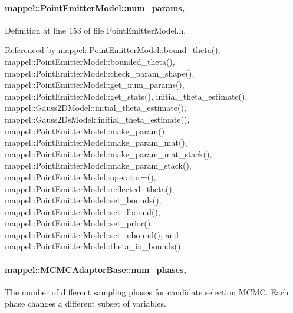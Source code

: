 \paragraph[{\texorpdfstring{num\+\_\+params}{num_params}}]{ mappel\+::\+Point\+Emitter\+Model\+::num\+\_\+params\hspace{0.3cm}{\ttfamily [protected]}, {\ttfamily [inherited]}}\hypertarget{classmappel_1_1PointEmitterModel_a9af0484391bd6021ddc04ac666ab49ad}{}\label{classmappel_1_1PointEmitterModel_a9af0484391bd6021ddc04ac666ab49ad}


Definition at line 153 of file Point\+Emitter\+Model.\+h.



Referenced by mappel\+::\+Point\+Emitter\+Model\+::bound\+\_\+theta(), mappel\+::\+Point\+Emitter\+Model\+::bounded\+\_\+theta(), mappel\+::\+Point\+Emitter\+Model\+::check\+\_\+param\+\_\+shape(), mappel\+::\+Point\+Emitter\+Model\+::get\+\_\+num\+\_\+params(), mappel\+::\+Point\+Emitter\+Model\+::get\+\_\+stats(), initial\+\_\+theta\+\_\+estimate(), mappel\+::\+Gauss2\+D\+Model\+::initial\+\_\+theta\+\_\+estimate(), mappel\+::\+Gauss2\+Ds\+Model\+::initial\+\_\+theta\+\_\+estimate(), mappel\+::\+Point\+Emitter\+Model\+::make\+\_\+param(), mappel\+::\+Point\+Emitter\+Model\+::make\+\_\+param\+\_\+mat(), mappel\+::\+Point\+Emitter\+Model\+::make\+\_\+param\+\_\+mat\+\_\+stack(), mappel\+::\+Point\+Emitter\+Model\+::make\+\_\+param\+\_\+stack(), mappel\+::\+Point\+Emitter\+Model\+::operator=(), mappel\+::\+Point\+Emitter\+Model\+::reflected\+\_\+theta(), mappel\+::\+Point\+Emitter\+Model\+::set\+\_\+bounds(), mappel\+::\+Point\+Emitter\+Model\+::set\+\_\+lbound(), mappel\+::\+Point\+Emitter\+Model\+::set\+\_\+prior(), mappel\+::\+Point\+Emitter\+Model\+::set\+\_\+ubound(), and mappel\+::\+Point\+Emitter\+Model\+::theta\+\_\+in\+\_\+bounds().

\paragraph[{\texorpdfstring{num\+\_\+phases}{num_phases}}]{ mappel\+::\+M\+C\+M\+C\+Adaptor\+Base\+::num\+\_\+phases\hspace{0.3cm}{\ttfamily [protected]}, {\ttfamily [inherited]}}\hypertarget{classmappel_1_1MCMCAdaptorBase_a44b90a984ace712584074dc17831fe25}{}\label{classmappel_1_1MCMCAdaptorBase_a44b90a984ace712584074dc17831fe25}
The number of different sampling phases for candidate selection M\+C\+MC. Each phase changes a different subset of variables. 


